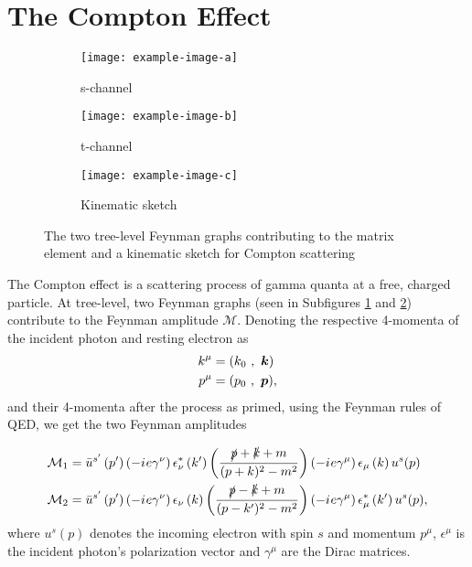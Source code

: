 \section{The Compton Effect}
\begin{figure}
	\centering
	\begin{subfigure}{0.49\textwidth}
		\centering
		\texttt{[image: example-image-a]}
		\caption{s-channel}
		\label{fig:schannel}
	\end{subfigure}
	\begin{subfigure}{0.49\textwidth}
		\centering
		\texttt{[image: example-image-b]}
		\caption{t-channel}
		\label{fig:tchannel}
	\end{subfigure}
	\par\bigskip
	\begin{subfigure}{0.45\textwidth}
		\centering
		\texttt{[image: example-image-c]}
		\caption{Kinematic sketch}
		\label{fig:kinematics}
	\end{subfigure}
	\caption{The two tree-level Feynman graphs contributing to the matrix element and a kinematic sketch for Compton scattering}
\end{figure}

The Compton effect is a scattering process of gamma quanta at a free, charged particle. At tree-level, two Feynman graphs (seen in Subfigures \ref{fig:schannel} and \ref{fig:tchannel}) contribute to the Feynman amplitude $\mathcal{M}$.
Denoting the respective 4-momenta of the incident photon and resting electron as
\begin{align*}
	k^\mu &= (k_0\ ,\ \boldsymbol{k}) \\
	p^\mu &= (p_0\ ,\ \boldsymbol{p}),
\end{align*}
and their 4-momenta after the process as primed, using the Feynman rules of QED, we get the two Feynman amplitudes

\begin{align}
	\mathcal{M}_1 &= \bar{u}^{s'}\left(p'\right)\left(-{i\mkern1mu} e\gamma^\nu\right)\epsilon^{*}_\nu\left(k'\right)\left(\frac{\slashed{p}+\slashed{k}+m}{(p+k)^2-m^2}\right)\left(-{i\mkern1mu} e\gamma^\mu\right)\epsilon_\mu\left(k\right)u^s(p)\label{eq:M1}\\
	\mathcal{M}_2 &= \bar{u}^{s'}\left(p'\right)\left(-{i\mkern1mu} e\gamma^\nu\right)\epsilon_\nu\left(k\right)\left(\frac{\slashed{p}-\slashed{k}+m}{(p-k')^2-m^2}\right)\left(-{i\mkern1mu} e\gamma^\mu\right)\epsilon^{*}_\mu\left(k'\right)u^s(p)\label{eq:M2},
\end{align}
where $u^s(p)$ denotes the incoming electron with spin $s$ and momentum $p^\mu$, $\epsilon^\mu$ is the incident photon's polarization vector and $\gamma^\mu$ are the Dirac matrices.

